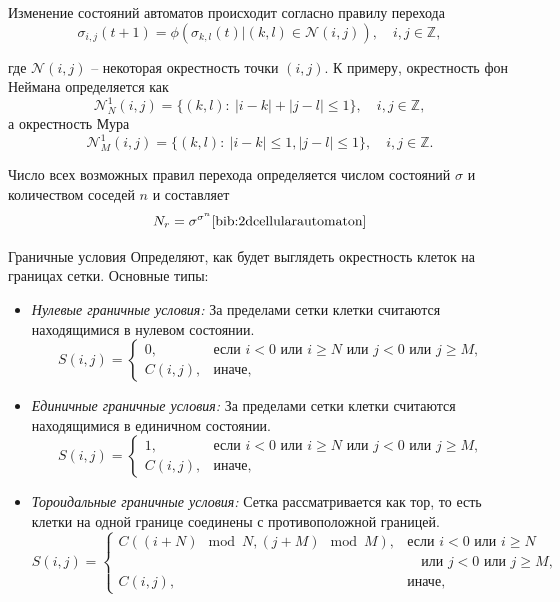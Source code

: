\documentclass[a4paper, final]{article}
\begin{document}
\noindent Изменение состояний автоматов происходит согласно правилу перехода
$$ \sigma _{i,j}(t+1)=\phi (\sigma _{k,l}(t)|(k,l)\in {\mathcal {N}}(i,j)), \quad i, j \in \mathbb{Z},$$

\noindent где ${\mathcal {N}}(i,j)$ -- некоторая окрестность точки $(i,j)$. 
К примеру, окрестность фон Неймана определяется как 
$${\mathcal {N}}_{N}^{1}(i,j)=\{(k,l):~|i-k|+|j-l|\leq 1\}, \quad i, j \in \mathbb{Z},$$
\noindent а окрестность Мура
$$\displaystyle {\mathcal {N}}_{M}^{1}(i,j)=\{(k,l):~|i-k|\leq 1,|j-l|\leq 1\},  \quad i, j \in \mathbb{Z}.$$

Число всех возможных правил перехода определяется числом состояний 
$\sigma$ и количеством соседей $n$ и составляет 
$$N_{r}=\sigma ^{\sigma ^{n}}\cite{bib:2dcellularautomaton}$$ 

Граничные условия Определяют, как будет выглядеть окрестность клеток на границах сетки. Основные типы:
\begin{itemize}
    \item \textit{Нулевые граничные условия:} За пределами сетки клетки считаются находящимися в нулевом состоянии.
    \[
        S(i, j) = 
        \begin{cases} 
            0, & \text{если } i < 0 \text{ или } i \geq N \text{ или } j < 0 \text{ или } j \geq M, \\
            C(i, j), & \text{иначе},
        \end{cases}
        \]
    \item \textit{Единичные граничные условия:} За пределами сетки клетки считаются находящимися в единичном состоянии.
    \[
        S(i, j) = 
        \begin{cases} 
            1, & \text{если } i < 0 \text{ или } i \geq N \text{ или } j < 0 \text{ или } j \geq M, \\
            C(i, j), & \text{иначе},
        \end{cases}
        \]
    \item \textit{Тороидальные граничные условия:} Сетка рассматривается как тор, то есть клетки на одной границе соединены с противоположной границей.
    \[
        S(i, j) = 
        \begin{cases} 
            C((i + N)\!\!\!\! \mod N, (j + M)\!\!\!\! \mod M), & \text{если } i < 0 \text{ или } i \geq N \\
            & \quad \text{или } j < 0 \text{ или } j \geq M, \\
            C(i, j), & \text{иначе},
        \end{cases}
    \]    
\end{itemize}
\end{document}
